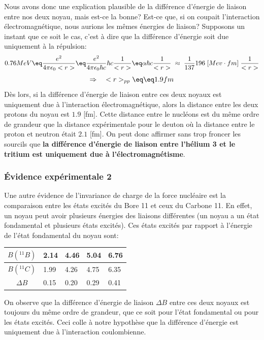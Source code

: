 Nous avons donc une explication plausible de la différence d'énergie de liaison entre nos deux noyau, mais est-ce la bonne? Est-ce que, si on coupait l'interaction électromagnétique, nous aurions les mêmes énergies de liaison? Supposons un instant que ce soit le cas, c'est à dire que la différence d'énergie soit due uniquement à la répulsion:
\begin{equation*}
    0.76 MeV \eq
    \dfrac{e^2}{4\pi\epsilon_0<r>}
    \eq \dfrac{e^2}{4\pi\epsilon_0\hbar c}\hbar c\dfrac{1}{<r>}
    \eq \alpha \hbar c \dfrac{1}{<r>}
    \;\approx\; \dfrac{1}{137} 196\; [Mev \cdot fm] \; \dfrac{1}{<r>}
\end{equation*}
\begin{equation*}
    \Rightarrow \quad  \; <r>_{pp} \eq \eq 1.9 fm
\end{equation*}
Dès lors, si la différence d'énergie de liaison entre ces deux noyaux est uniquement due à l'interaction électromagnétique, alors la distance entre les deux protons du noyau est $1.9$ [fm]. Cette distance entre le nucléons est du même ordre de grandeur que la distance expérimentale pour le deuton où la distance entre le proton et neutron était $2.1$ [fm]. On peut donc affirmer sans trop froncer les sourcils que \textbf{la différence d'énergie de liaison entre l'hélium 3 et le tritium est uniquement due à l'électromagnétisme}.


\subsubsection{Évidence expérimentale 2} \label{Evid_exp2}


Une autre évidence de l'invariance de charge de la force nucléaire est la comparaison entre les états excités du Bore 11 et ceux du Carbone 11. En effet, un noyau peut avoir plusieurs énergies des liaisons différentes (un noyau a un état fondamental et plusieurs états excités). Ces états excités par rapport à l'énergie de l'état fondamental du noyau sont:
\begin{center}
\begin{tabular}{|c|p{0.7cm}|p{0.7cm}|p{0.7cm}|p{0.7cm}|}
    \hline
	$B(^{11}B)$& 2.14 & 4.46 & 5.04 & 6.76\\
	\hline
	$B(^{11}C)$& 1.99 & 4.26 & 4.75 & 6.35\\
	\hline
	$\Delta B$ & 0.15 & 0.20 & 0.29 & 0.41\\
	\hline
\end{tabular}
\end{center}
On observe que la différence d'énergie de liaison $\Delta B$ entre ces deux noyaux est toujours du même ordre de grandeur, que ce soit pour l'état fondamental ou pour les états excités. Ceci colle à notre hypothèse que la différence d'énergie est uniquement due à l'interaction coulombienne.\\


